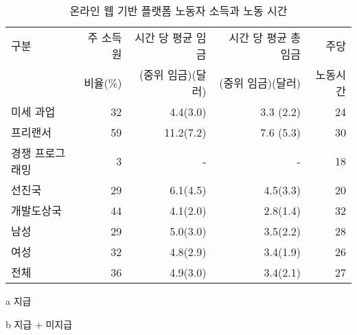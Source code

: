\begin{itemize}
\begin{itemize}
			\begin{table}[htp]
			\begin{center}
			\begin{threeparttable}
			\caption{온라인 웹 기반 플랫폼 노동자 소득과 노동 시간}\label{tab:ILO2021income}
			\begin{tabularx}{\textwidth}{lrrrr}
			\toprule
			 구분 & 주 소득원  & 시간 당 평균 임금\tnote{a} & 시간 당 평균 총 임금\tnote{b} & 주당  \\
			 &  비율(\%) & (중위 임금)(달러) & (중위 임금)(달러) & 노동시간\tnote{b} \\
			\midrule
			미세 과업 & 32 & 4.4(3.0) & 3.3 (2.2) & 24  \\
			프리랜서 & 59 & 11.2(7.2) & 7.6 (5.3)  & 30 \\
			경쟁 프로그래밍 & 3 & - & - & 18 \\
			\midrule 
			선진국 & 29 & 6.1(4.5) & 4.5(3.3)  & 20  \\
			개발도상국 & 44 & 4.1(2.0) & 2.8(1.4) & 32  \\
			\midrule
			남성 & 29 & 5.0(3.0) & 3.5(2.2)  & 28 \\
			여성 & 32 & 4.8(2.9) & 3.4(1.9)  & 26 \\
			\midrule
			전체 & 36 & 4.9(3.0) & 3.4(2.1)  & 27 \\
			\bottomrule
			\end{tabularx}
			\begin{tablenotes}
			\small
			\item[a] 지급
			\item[b] 지급 $+$ 미지급 
			\end{tablenotes}
			\end{threeparttable}
			\end{center}
			\end{table}%
	

\end{itemize}
\end{itemize}

